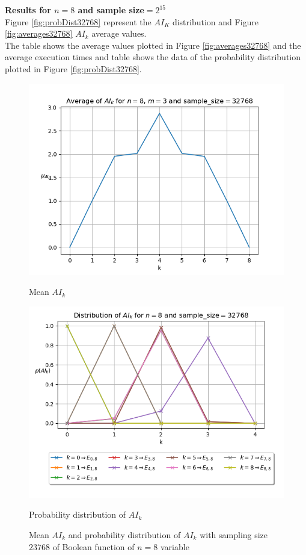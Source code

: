 \documentclass[11pt]{llncs}
\begin{document}
\textbf{Results for $n=8$ and sample size$=2^{15}$}\\
Figure \ref{fig:probDist32768} represent the $AI_K$ distribution and Figure \ref{fig:averages32768} $AI_k$ average values.\\
The table  shows the average values plotted in Figure \ref{fig:averages32768} and the average execution times and table  shows the data of the probability distribution plotted in Figure \ref{fig:probDist32768}.

\begin{figure}[ht]
    \centering
    \begin{minipage}[b]{0.45\textwidth}
        \centering
        \includegraphics[width=\textwidth]{images/WPB_3_sample_size_32768_dist.png}
        \caption{Mean $AI_k$}
        \label{fig:averages32768}
    \end{minipage}
    \hfill
    \begin{minipage}[b]{0.5\textwidth}
        \centering
        \includegraphics[width=\textwidth]{images/WPB_3_sample_size_32768_dist_prob.png}
        \caption{Probability distribution of $AI_k$}
        \label{fig:probDist32768}
    \end{minipage}
    \caption{Mean $AI_k$ and probability distribution of $AI_k$ with sampling size $23768$ of Boolean function of $n=8$ variable}
    \label{fig:main2}
\end{figure}
\end{document}
